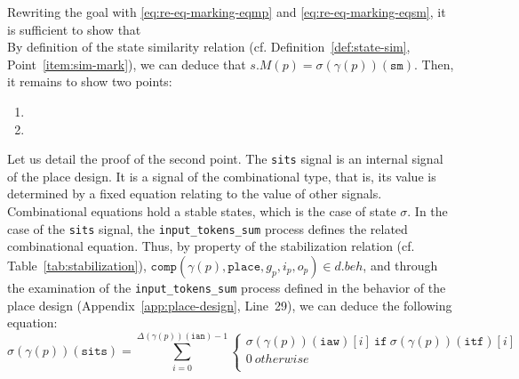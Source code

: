 \noindent{}Rewriting the goal with \eqref{eq:re-eq-marking-eqmp} and
\eqref{eq:re-eq-marking-eqsm}, it is sufficient to show that \\

By definition of the state similarity relation
(cf. Definition~\ref{def:state-sim}, Point~\ref{item:sim-mark}), we
can deduce that $s.M(p)=\sigma(\gamma(p))(\texttt{sm})$. Then, it
remains to show two points:
\begin{enumerate}
\item {}
\item {}
\end{enumerate}

Let us detail the proof of the second point. The \texttt{sits} signal
is an internal signal of the place design. It is a signal of the
combinational type, that is, its value is determined by a fixed
equation relating to the value of other signals. Combinational
equations hold a stable states, which is the case of state $\sigma$.
In the case of the \texttt{sits} signal, the
\texttt{input\_tokens\_sum} process defines the related combinational
equation.  Thus, by property of the stabilization relation
(cf. Table~\ref{tab:stabilization}),
$\mathtt{comp}(\gamma(p),\mathtt{place},g_p,i_p,o_p)\in{}d.beh$, and
through the examination of the \texttt{input\_tokens\_sum} process
defined in the behavior of the place design
(Appendix~\ref{app:place-design}, Line~29), we can deduce the
following equation:
\begin{equation}
  \label{eq:sits-at-fe}
  \sigma(\gamma(p))(\texttt{sits})=\sum\limits_{i=0}^{\Delta(\gamma(p))(\texttt{ian})-1}
  \begin{cases}
    \sigma(\gamma(p))(\texttt{iaw})[i]~\mathtt{if}~\sigma(\gamma(p))(\texttt{itf})[i]\\
    0~otherwise \\
  \end{cases}
\end{equation}

